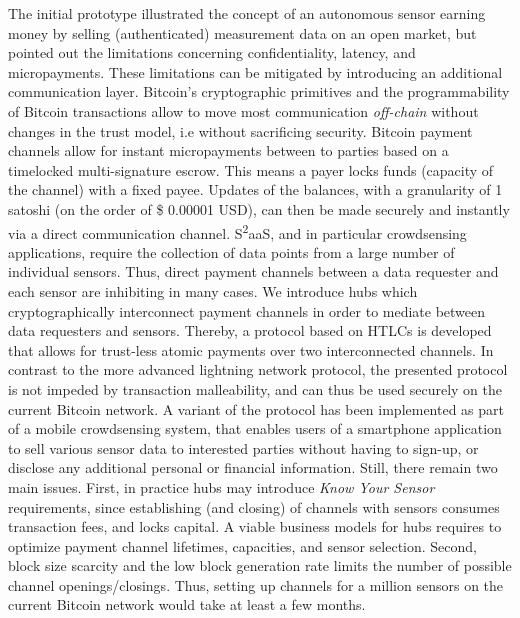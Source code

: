 The initial prototype illustrated the concept of an autonomous sensor earning money by selling (authenticated) measurement data on an open market, but pointed out the limitations concerning confidentiality, latency, and micropayments. These limitations can be mitigated by introducing an additional communication layer. Bitcoin's cryptographic primitives and the programmability of Bitcoin transactions allow to move most communication \emph{off-chain} without changes in the trust model, i.e without sacrificing security. Bitcoin payment channels allow for instant micropayments between to parties based on a timelocked multi-signature escrow. This means a payer locks funds (capacity of the channel) with a fixed payee. Updates of the balances, with a granularity of 1 satoshi (on the order of \$ 0.00001 USD), can then be made securely and instantly via a direct communication channel. S\textsuperscript{2}aaS, and in particular crowdsensing applications, require the collection of data points from a large number of individual sensors. Thus, direct payment channels between a data requester and each sensor are inhibiting in many cases. We introduce hubs which cryptographically interconnect payment channels in order to mediate between data requesters and sensors. Thereby, a protocol based on \ac{HTLC}s is developed that allows for trust-less atomic payments over two interconnected channels. In contrast to the more advanced lightning network protocol, the presented protocol is not impeded by transaction malleability, and can thus be used securely on the current Bitcoin network. A variant of the protocol has been implemented as part of a mobile crowdsensing system, that enables users of a smartphone application to sell various sensor data to interested parties without having to sign-up, or disclose any additional personal or financial information. Still, there remain two main issues. First, in practice hubs may introduce \emph{Know Your Sensor} requirements, since establishing (and closing) of channels with sensors consumes transaction fees, and locks capital. A viable business models for hubs requires to optimize payment channel lifetimes, capacities, and sensor selection. Second, block size scarcity and the low block generation rate limits the number of possible channel openings/closings. Thus, setting up channels for a million sensors on the current Bitcoin network would take at least a few months.

